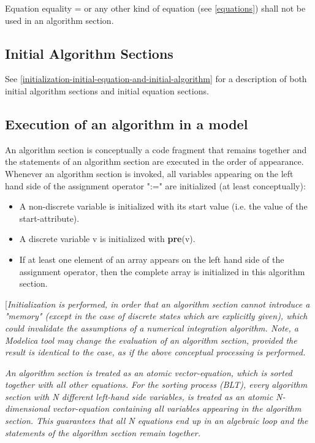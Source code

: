 \documentclass[10pt,a4paper]{report}
\def\doublelabel#1{\label{#1}}
\begin{document}
Equation equality = or any other kind of equation (see \ref{equations}) shall
not be used in an algorithm section.

\subsection{Initial Algorithm Sections}\doublelabel{initial-algorithm-sections}

See \ref{initialization-initial-equation-and-initial-algorithm} for a description of both initial algorithm sections and
initial equation sections.

\subsection{Execution of an algorithm in a model}\doublelabel{execution-of-an-algorithm-in-a-model}

An algorithm section is conceptually a code fragment that remains
together and the statements of an algorithm section are executed in the
order of appearance. Whenever an algorithm section is invoked, all
variables appearing on the left hand side of the assignment operator
":=" are initialized (at least conceptually):

\begin{itemize}
\item
  A non-discrete variable is initialized with its start value (i.e. the
  value of the start-attribute).
\item
  A discrete variable v is initialized with \textbf{pre}(v).
\item
  If at least one element of an array appears on the left hand side of
  the assignment operator, then the complete array is initialized in
  this algorithm section.
\end{itemize}

{[}\emph{Initialization is performed, in order that an algorithm section
cannot introduce a "memory" (except in the case of discrete states which
are explicitly given), which could invalidate the assumptions of a
numerical integration algorithm. Note, a Modelica tool may change the
evaluation of an algorithm section, provided the result is identical to
the case, as if the above conceptual processing is performed.}

\emph{An algorithm section is treated as an atomic vector-equation,
which is sorted together with all other equations. For the sorting
process (BLT), every algorithm section with N different left-hand side
variables, is treated as an atomic N-dimensional vector-equation
containing all variables appearing in the algorithm section. This
guarantees that all N equations end up in an algebraic loop and the
statements of the algorithm section remain together.}
\end{document}
